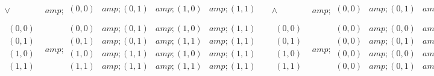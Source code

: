 \(\quad 
\begin{array}{c|c}
 \lor  &amp; 
\begin{array}{cccc}
 (0,0) &amp; (0,1) &amp; (1,0) &amp; (1,1) \\
\end{array}
 \\
\hline
 
\begin{array}{c}
 (0,0) \\
 (0,1) \\
 (1,0) \\
 (1,1) \\
\end{array}
 &amp; 
\begin{array}{cccc}
 (0,0) &amp; (0,1) &amp; (1,0) &amp; (1,1) \\
 (0,1) &amp; (0,1) &amp; (1,1) &amp; (1,1) \\
 (1,0) &amp; (1,1) &amp; (1,0) &amp; (1,1) \\
 (1,1) &amp; (1,1) &amp; (1,1) &amp; (1,1) \\
\end{array}
 \\
\end{array}
\text{          }
\begin{array}{c|c}
 \land  &amp; 
\begin{array}{cccc}
 (0,0) &amp; (0,1) &amp; (1,0) &amp; (1,1) \\
\end{array}
 \\
\hline
 
\begin{array}{c}
 (0,0) \\
 (0,1) \\
 (1,0) \\
 (1,1) \\
\end{array}
 &amp; 
\begin{array}{cccc}
 (0,0) &amp; (0,0) &amp; (0,0) &amp; (0,0) \\
 (0,0) &amp; (0,1) &amp; (0,0) &amp; (0,1) \\
 (0,0) &amp; (0,0) &amp; (1,0) &amp; (1,0) \\
 (0,0) &amp; (0,1) &amp; (10) &amp; (1,1) \\
\end{array}
 \\
\end{array}\)




